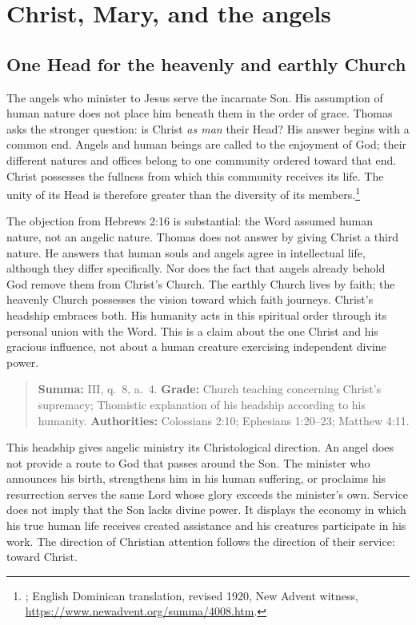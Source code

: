 \section{Christ, Mary, and the angels}

\subsection{One Head for the heavenly and earthly Church}

The angels who minister to Jesus serve the incarnate Son. His assumption of
human nature does not place him beneath them in the order of grace. Thomas
asks the stronger question: is Christ \emph{as man} their Head? His answer
begins with a common end. Angels and human beings are called to the enjoyment
of God; their different natures and offices belong to one community ordered
toward that end. Christ possesses the fullness from which this community
receives its life. The unity of its Head is therefore greater than the
diversity of its members.\footnote{;
English Dominican translation, revised 1920, New Advent witness,
\url{https://www.newadvent.org/summa/4008.htm}.}

The objection from Hebrews 2:16 is substantial: the Word assumed human nature,
not an angelic nature. Thomas does not answer by giving Christ a third nature.
He answers that human souls and angels agree in intellectual life, although
they differ specifically. Nor does the fact that angels already behold God
remove them from Christ's Church. The earthly Church lives by faith; the
heavenly Church possesses the vision toward which faith journeys. Christ's
headship embraces both. His humanity acts in this spiritual order through its
personal union with the Word. This is a claim about the one Christ and his
gracious influence, not about a human creature exercising independent divine
power.

\begin{quote}\small
\textbf{Summa:} III, q.~8, a.~4.\quad
\textbf{Grade:} Church teaching concerning Christ's supremacy; Thomistic
explanation of his headship according to his humanity.\quad
\textbf{Authorities:} Colossians 2:10; Ephesians 1:20--23; Matthew 4:11.
\end{quote}

This headship gives angelic ministry its Christological direction. An angel
does not provide a route to God that passes around the Son. The minister who
announces his birth, strengthens him in his human suffering, or proclaims his
resurrection serves the same Lord whose glory exceeds the minister's own.
Service does not imply that the Son lacks divine power. It displays the
economy in which his true human life receives created assistance and his
creatures participate in his work. The direction of Christian attention
follows the direction of their service: toward Christ.


